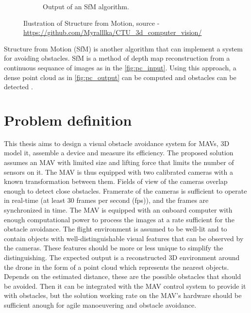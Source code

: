 \begin{figure}[h]
\begin{subfigure}[h]{0.65\textwidth}
      \caption{Output of an SfM algorithm.}
      \label{fig:pc_output}
    \end{subfigure}
    \caption{Ilustration of Structure from Motion, source - \url{https://github.com/Myralllka/CTU_3d_computer_vision/}}
    \label{fig:pc_recons}
\end{figure}

Structure from Motion (SfM) is another algorithm that can implement a system for avoiding obstacles. 
SfM is a method of depth map reconstruction from a continuous sequance of images as in the \autoref{fig:pc_input}.
Using this approach, a dense point cloud as in \autoref{fig:pc_output} can be computed and obstacles can be detected \cite{Lee2008}. 

\section{Problem definition}
This thesis aims to design a visual obstacle avoidance system for MAVs, 3D model it, assemble a device and measure its efficiency. 
The proposed solution assumes an MAV with limited size and lifting force that limits the number of sensors on it. 
The MAV is thus equipped with two calibrated cameras with a known transformation between them. 
Fields of view of the cameras overlap enough to detect close obstacles.
Framerate of the cameras is sufficient to operate in real-time (at least 30 frames per second (fps)), and the frames are synchronized in time.
The MAV is equipped with an onboard computer with enough computational power to process the images at a rate sufficient for the obstacle avoidance.
The flight environment is assumed to be well-lit and to contain objects with well-distinguishable visual features that can be observed by the cameras.
These features should be more or less unique to simplify the distinguishing.
The expected output is a reconstructed 3D environment around the drone in the form of a point cloud which represents the nearest objects.
Depends on the estimated distance, these are the possible obstacles that should be avoided.
Then it can be integrated with the MAV control system to provide it with obstacles, but the solution working rate on the MAV's hardware should be sufficient anough for agile manoeuvering and obstacle avoidance.

